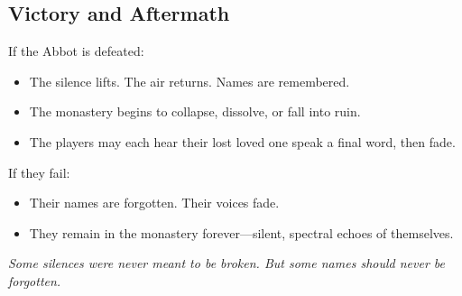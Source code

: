 \documentclass[twocolumn,nodeprecatedcode,bg=print]{dndbook/dndbook}
\begin{document}
\subsection*{Victory and Aftermath}

If the Abbot is defeated:
    \begin{itemize}
    \item The silence lifts. The air returns. Names are remembered.
    \item The monastery begins to collapse, dissolve, or fall into ruin.
    \item The players may each hear their lost loved one speak a final word, then fade.
    \end{itemize}

If they fail:
    \begin{itemize}
    \item Their names are forgotten. Their voices fade.
    \item They remain in the monastery forever—silent, spectral echoes of themselves.
    \end{itemize}

\vspace{\baselineskip}\noindent
\emph{Some silences were never meant to be broken. But some names should never be forgotten.}

{}
\clearpage
\end{document}
